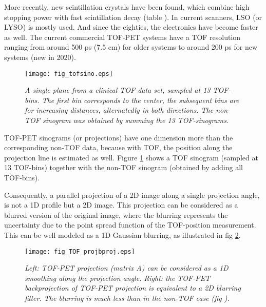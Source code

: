 More recently, new scintillation crystals have been found, which
combine high stopping power with fast scintillation decay (table
). In current scanners, LSO (or LYSO) is mostly
used. And since the eighties, the electronics have become faster as
well. The current commercial TOF-PET systems have a TOF resolution
ranging from around 500 ps (7.5 cm) for older systems to around 200 ps
for new systems (new in 2020).

\begin{figure}[t]
\centering
  \texttt{[image: fig\_tofsino.eps]}
  \vspace{-4mm}
  \caption{\label{fig:tofsino} \emph{A single plane from a clinical
  TOF-data set, sampled at 13 TOF-bins. The first bin corresponds to
  the center, the subsequent bins are for increasing distances,
  alternatedly in both directions. The non-TOF sinogram was obtained
  by summing the 13 TOF-sinograms.}}
\end{figure}
TOF-PET sinograms (or projections) have one dimension more than the
corresponding non-TOF data, because with TOF, the position along the
projection line is estimated as well. Figure \ref{fig:tofsino} shows a
TOF sinogram (sampled at 13 TOF-bins) together with the non-TOF
sinogram (obtained by adding all TOF-bins).

Consequently, a parallel projection of a 2D image along a single
projection angle, is not a 1D profile but a 2D image. This projection
can be considered as a blurred version of the original image, where
the blurring represents the uncertainty due to the point spread
function of the TOF-position measurement. This can be well modeled as
a 1D Gaussian blurring, as illustrated in fig \ref{fig:TOFproj}.
\begin{figure}[tb]
\centering
  \texttt{[image: fig\_TOF\_projbproj.eps]}
  \caption{\label{fig:TOFproj} \emph{Left: TOF-PET projection (matrix
  A) can be considered as a 1D smoothing along the projection
  angle. Right: the TOF-PET backprojection of TOF-PET projection is
  equivalent to a 2D blurring filter. The blurring is much less than
  in the non-TOF case (fig ).}}
\end{figure}


